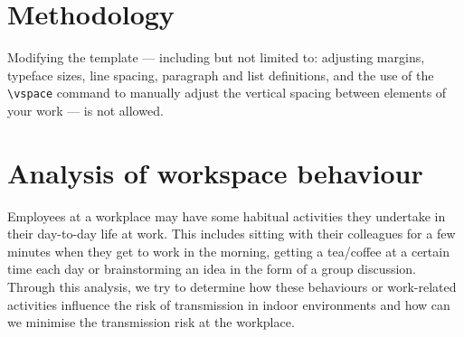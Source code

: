\documentclass[acmtog]{acmart}
\begin{document}
\section{Methodology}

Modifying the template --- including but not limited to: adjusting
margins, typeface sizes, line spacing, paragraph and list definitions,
and the use of the \verb|\vspace| command to manually adjust the
vertical spacing between elements of your work --- is not allowed.






\section{Analysis of workspace behaviour}
\begin{table}[!h]
\centering
\caption{}
\label{tab:my-table}
\end{table}
Employees at a workplace may have some habitual activities they undertake in their day-to-day life at work. This includes sitting with their colleagues for a few minutes when they get to work in the morning, getting a tea/coffee at a certain time each day or brainstorming an idea in the form of a group discussion. Through this analysis, we try to determine how these behaviours or work-related activities influence the risk of transmission in indoor environments and how can we minimise the transmission risk at the workplace.
\end{document}
